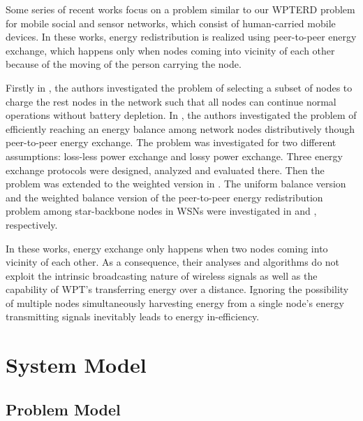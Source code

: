 \documentclass[journal,10pt]{IEEEtran}
\begin{document}
Some series of recent works \cite{Bulut2014,Niko2016,Niko2017,Madhja2016,Madhja2017} focus on a problem similar to our WPTERD problem for mobile social and sensor networks, which consist of human-carried mobile devices. In these works, energy redistribution is realized using peer-to-peer energy exchange, which happens only when nodes coming into vicinity of each other because of the moving of the person carrying the node.

Firstly in \cite{Bulut2014}, the authors investigated the problem of selecting a subset of nodes to charge the rest nodes in the network such that all nodes can continue normal operations without battery depletion. In \cite{Niko2016}, the authors investigated the problem of efficiently reaching an energy balance among network nodes distributively though peer-to-peer energy exchange. The problem was investigated for two different assumptions: loss-less power exchange and lossy power exchange. Three energy exchange protocols were designed, analyzed and evaluated there. Then the problem was extended to the weighted version in \cite{Niko2017}. The uniform balance version and the weighted balance version of the peer-to-peer energy redistribution problem among star-backbone nodes in WSNs were investigated in \cite{Madhja2016} and \cite{Madhja2017}, respectively.

In these works, energy exchange only happens when two nodes coming into vicinity of each other. As a consequence, their analyses and algorithms do not exploit the intrinsic broadcasting nature of wireless signals as well as the capability of WPT's transferring energy over a distance. Ignoring the possibility of multiple nodes simultaneously harvesting energy from a single node's energy transmitting signals inevitably leads to energy in-efficiency.


\section{System Model}
\label{sec_model}
\subsection{Problem Model}
\end{document}
